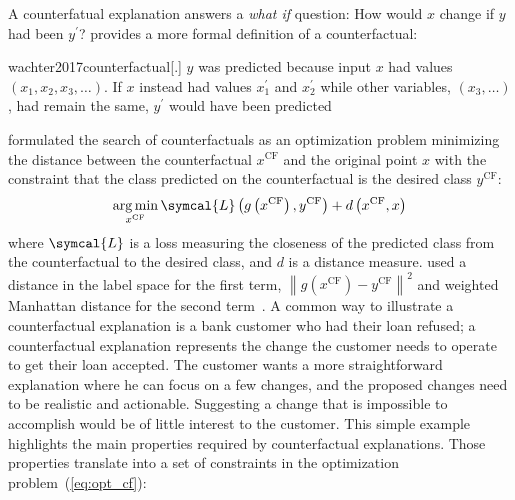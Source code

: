 \documentclass[../main.tex]{subfiles}
\begin{document}
	A counterfatual explanation answers a \emph{what if} question: How would \(x\) change if \(y\) had been \(y^{\prime}\)?
	\citeauthor{wachter2017counterfactual} provides a more formal definition of a counterfactual:
	\begin{displaycquote}{wachter2017counterfactual}[.]
		\(y\) was predicted because input \(x\) had values \(\left(x_{1}, x_{2}, x_{3}, \ldots\right)\). If \(x\) instead had values \(x_{1}^{\prime}\) and \(x_{2}^{\prime}\) while other variables, \(\left(x_{3}, \ldots\right)\), had remain the same, \(y^{\prime}\) would have been predicted
	\end{displaycquote}
	\citeauthor{wachter2017counterfactual} formulated the search of counterfactuals as an optimization problem minimizing the distance between the counterfactual \(x^{\text{CF}}\) and the original point \(x\) with the constraint that the class predicted on the counterfactual is the desired class \(y^{\text{CF}}\):
	\begin{equation}
		\argmin_{x^{\text{CF}}} \symcal{L}\left(g\left(x^{\text{CF}}\right), y^{\text{CF}} \right) + d\left(x^{\text{CF}}, x\right)\label{eq:opt_cf}
	\end{equation}
	where \(\symcal{L}\) is a loss measuring the closeness of the predicted class from the counterfactual to the desired class, and \(d\) is a distance measure.
	\citeauthor{wachter2017counterfactual} used a distance in the label space for the first term, \({\left\|g\left(x^{\text{CF}}\right) - y^{\text{CF}}\right\|}^{2}\) and weighted Manhattan distance for the second term~\cite{wachter2017counterfactual}.
	A common way to illustrate a counterfactual explanation is a bank customer who had their loan refused; a counterfactual explanation represents the change the customer needs to operate to get their loan accepted.
	The customer wants a more straightforward explanation where he can focus on a few changes, and the proposed changes need to be realistic and actionable.
	Suggesting a change that is impossible to accomplish would be of little interest to the customer.
	This simple example highlights the main properties required by counterfactual explanations.
	Those properties translate into a set of constraints in the optimization problem~(\cref{eq:opt_cf}):
\end{document}
